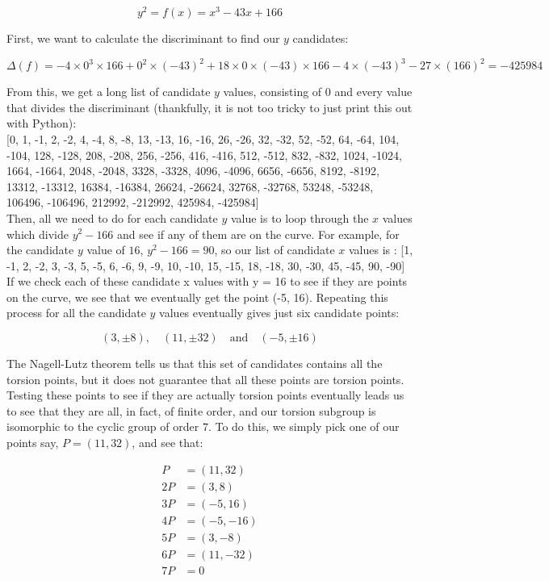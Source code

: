 \documentclass{article}
\begin{document}
\[y^2 = f(x) = x^3 - 43 x + 166\]

First, we want to calculate the discriminant to find our $y$ candidates:

\[\Delta(f) =  -4 \times 0^3 \times 166 + 0^2 \times (-43)^2 + 18 \times 0 \times (-43) \times 166 - 4 \times (-43)^3 - 27 \times (166)^2 = -425984\]

From this, we get a long list of candidate $y$ values, consisting of 0 and every value that divides the discriminant (thankfully, it is not too tricky to just print this out with Python):\\

[0, 1, -1, 2, -2, 4, -4, 8, -8, 13, -13, 16, -16, 26, -26, 32, -32, 52, -52, 64, -64, 104, -104, 128, -128, 208, -208, 256, -256, 416, -416, 512, -512, 832, -832, 1024, -1024, 1664, -1664, 2048, -2048, 3328, -3328, 4096, -4096, 6656, -6656, 8192, -8192, 13312, -13312, 16384, -16384, 26624, -26624, 32768, -32768, 53248, -53248, 106496, -106496, 212992, -212992, 425984, -425984]\\

Then, all we need to do for each candidate $y$ value is to loop through the $x$ values which divide $y^2 - 166$ and see if any of them are on the curve. For example, for the candidate $y$ value of $16$, $y^2 - 166 = 90$, so our list of candidate $x$ values is : [1, -1, 2, -2, 3, -3, 5, -5, 6, -6, 9, -9, 10, -10, 15, -15, 18, -18, 30, -30, 45, -45, 90, -90] If we check each of these candidate x values with y = 16 to see if they are points on the curve, we see that we eventually get the point (-5, 16). Repeating this process for all the candidate $y$ values eventually  gives just six candidate points:

\[(3, \pm 8), \quad (11, \pm 32) \quad \text{and} \quad (-5, \pm 16)\]

The Nagell-Lutz theorem tells us that this set of candidates contains all the torsion points, but it does not guarantee that all these points are torsion points. Testing these points to see if they are actually torsion points eventually leads us to see that they are all, in fact, of finite order, and our torsion subgroup is isomorphic to the cyclic group of order $7$. To do this, we simply pick one of our points say, $P = (11, 32)$, and see that:

\begin{align*} 
P &= (11, 32)\\
2P &= (3, 8)\\
3P &= (-5, 16)\\
4P &= (-5, -16)\\
5P &= (3, -8)\\
6P &= (11, -32)\\
7P &= 0
\end{align*} 
\end{document}
